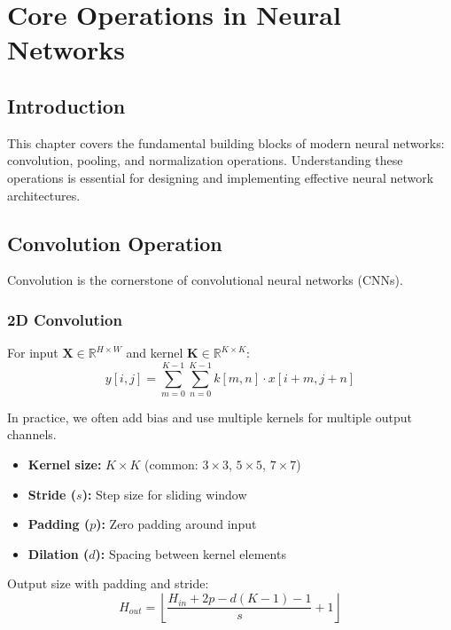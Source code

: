 ﻿\clearpage
\cleardoublepage

\chapter{Core Operations in Neural Networks}

\section{Introduction}

This chapter covers the fundamental building blocks of modern neural networks: convolution, pooling, and normalization operations. Understanding these operations is essential for designing and implementing effective neural network architectures.

\section{Convolution Operation}

Convolution is the cornerstone of convolutional neural networks (CNNs).

\subsection{2D Convolution}

For input $\mathbf{X} \in \mathbb{R}^{H \times W}$ and kernel $\mathbf{K} \in \mathbb{R}^{K \times K}$:
\begin{equation}
y[i,j] = \sum_{m=0}^{K-1}\sum_{n=0}^{K-1} k[m,n] \cdot x[i+m, j+n]
\end{equation}

In practice, we often add bias and use multiple kernels for multiple output channels.

\begin{properties}
\begin{itemize}
    \item \textbf{Kernel size:} $K \times K$ (common: $3\times3$, $5\times5$, $7\times7$)
    \item \textbf{Stride ($s$):} Step size for sliding window
    \item \textbf{Padding ($p$):} Zero padding around input
    \item \textbf{Dilation ($d$):} Spacing between kernel elements
\end{itemize}
\end{properties}

Output size with padding and stride:
\begin{equation}
H_{out} = \left\lfloor \frac{H_{in} + 2p - d(K-1) - 1}{s} + 1 \right\rfloor
\end{equation}

